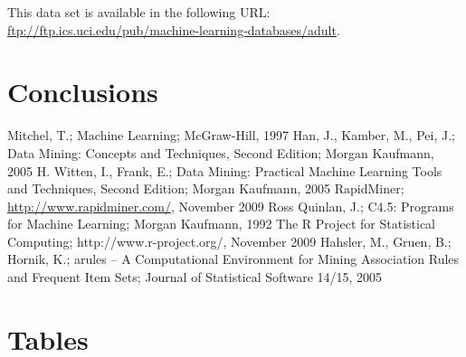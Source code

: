 \documentclass[a4paper]{llncs}
\begin{document}
This data set is available in the following URL: \url{ftp://ftp.ics.uci.edu/pub/machine-learning-databases/adult}.


\section{Conclusions}

\begin{thebibliography}{1}
Mitchel, T.; Machine Learning; McGraw-Hill, 1997
Han, J., Kamber, M., Pei, J.; Data Mining: Concepts and Techniques, Second Edition; Morgan Kaufmann, 2005
H. Witten, I., Frank, E.; Data Mining: Practical Machine Learning Tools and Techniques, Second Edition; Morgan Kaufmann, 2005
RapidMiner; \url{http://www.rapidminer.com/}, November 2009
Ross Quinlan, J.; C4.5: Programs for Machine Learning; Morgan Kaufmann, 1992
The R Project for Statistical Computing; http://www.r-project.org/, November 2009
Hahsler, M., Gruen, B.; Hornik, K.; arules -- A Computational Environment for Mining Association Rules and Frequent Item Sets; Journal of Statistical Software 14/15, 2005
\end{thebibliography}

\clearpage

\appendix

\section{Tables}
\end{document}
